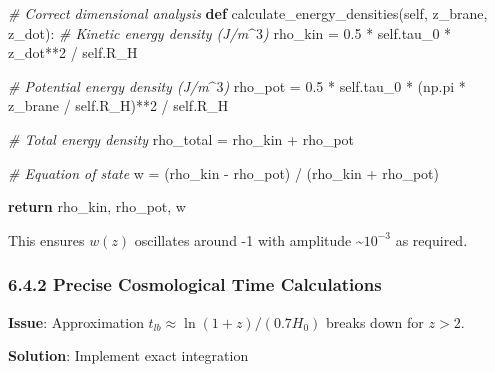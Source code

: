\documentclass[
  11pt,
]{report}
\newenvironment{Shaded}{}{}
\newcommand{\CommentTok}[1]{\textcolor[rgb]{0.38,0.63,0.69}{\textit{#1}}}
\newcommand{\ControlFlowTok}[1]{\textcolor[rgb]{0.00,0.44,0.13}{\textbf{#1}}}
\newcommand{\DecValTok}[1]{\textcolor[rgb]{0.25,0.63,0.44}{#1}}
\newcommand{\FloatTok}[1]{\textcolor[rgb]{0.25,0.63,0.44}{#1}}
\newcommand{\KeywordTok}[1]{\textcolor[rgb]{0.00,0.44,0.13}{\textbf{#1}}}
\newcommand{\NormalTok}[1]{#1}
\newcommand{\OperatorTok}[1]{\textcolor[rgb]{0.40,0.40,0.40}{#1}}
\newcommand{\VariableTok}[1]{\textcolor[rgb]{0.10,0.09,0.49}{#1}}
\begin{document}
\begin{Shaded}
\begin{Highlighting}[]
\CommentTok{\# Correct dimensional analysis}
\KeywordTok{def}\NormalTok{ calculate\_energy\_densities(}\VariableTok{self}\NormalTok{, z\_brane, z\_dot):}
    \CommentTok{\# Kinetic energy density (J/m$\^{}3$)}
\NormalTok{    rho\_kin }\OperatorTok{=} \FloatTok{0.5} \OperatorTok{*} \VariableTok{self}\NormalTok{.tau\_0 }\OperatorTok{*}\NormalTok{ z\_dot}\OperatorTok{**}\DecValTok{2} \OperatorTok{/} \VariableTok{self}\NormalTok{.R\_H}
    
    \CommentTok{\# Potential energy density (J/m$\^{}3$) }
\NormalTok{    rho\_pot }\OperatorTok{=} \FloatTok{0.5} \OperatorTok{*} \VariableTok{self}\NormalTok{.tau\_0 }\OperatorTok{*}\NormalTok{ (np.pi }\OperatorTok{*}\NormalTok{ z\_brane }\OperatorTok{/} \VariableTok{self}\NormalTok{.R\_H)}\OperatorTok{**}\DecValTok{2} \OperatorTok{/} \VariableTok{self}\NormalTok{.R\_H}
    
    \CommentTok{\# Total energy density}
\NormalTok{    rho\_total }\OperatorTok{=}\NormalTok{ rho\_kin }\OperatorTok{+}\NormalTok{ rho\_pot}
    
    \CommentTok{\# Equation of state}
\NormalTok{    w }\OperatorTok{=}\NormalTok{ (rho\_kin }\OperatorTok{{-}}\NormalTok{ rho\_pot) }\OperatorTok{/}\NormalTok{ (rho\_kin }\OperatorTok{+}\NormalTok{ rho\_pot)}
    
    \ControlFlowTok{return}\NormalTok{ rho\_kin, rho\_pot, w}
\end{Highlighting}
\end{Shaded}

This ensures \(w(z)\) oscillates around -1 with amplitude
\textasciitilde{}\(10^{-3}\) as required.

\subsubsection{6.4.2 Precise Cosmological Time
Calculations}\label{precise-cosmological-time-calculations}

\textbf{Issue}: Approximation \(t_{lb} \approx \ln(1+z)/(0.7 H_0)\)
breaks down for \(z > 2\).

\textbf{Solution}: Implement exact integration
\end{document}
